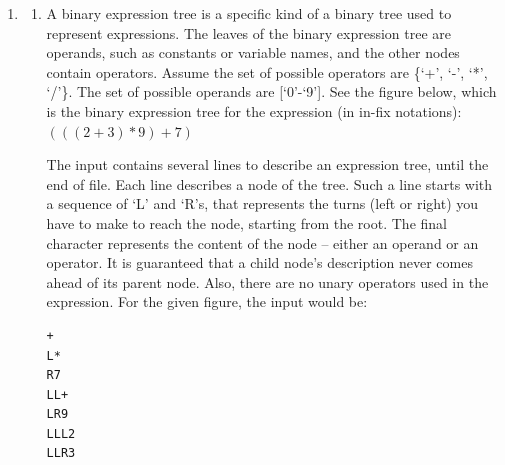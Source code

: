\documentclass[12pt,a3paper]{article}
\newcommand{\yr}[1]{\hfill\textcolor{gray}{\small\textbf{[#1]}}}
\newcommand{\mk}[1]{\textcolor{orange!70!black}{\small\textbf{(#1 marks)}}}
\begin{document}
\begin{enumerate}
\begin{lstlisting}
int insertNode(int *tree, int x);
// x will be inserted into tree as a node.
\end{lstlisting}

\noindent
Also write a recursive C function that counts the number of nodes available in the tree.
\mk{13} \yr{CSE 101 | L-1/T-1 | 2020--21}

\item
  \begin{enumerate}
    \item A binary expression tree is a specific kind of a binary tree used to represent
    expressions. The leaves of the binary expression tree are operands, such as constants or
    variable names, and the other nodes contain operators. Assume the set of possible
    operators are \{`+', `-', `*', `/'\}. The set of possible operands are [`0'-`9']. See the figure
    below, which is the binary expression tree for the expression (in in-fix notations):
    $(((2+3)*9)+7)$

    \begin{figure}[h]
      \centering
    \end{figure}

    The input contains several lines to describe an expression tree, until the end of file. Each
    line describes a node of the tree. Such a line starts with a sequence of `L' and `R's, that
    represents the turns (left or right) you have to make to reach the node, starting from the
    root. The final character represents the content of the node -- either an operand or an
    operator. It is guaranteed that a child node's description never comes ahead of its parent
    node. Also, there are no unary operators used in the expression. For the given figure, the
    input would be:

    \begin{lstlisting}
+
L*
R7
LL+
LR9
LLL2
LLR3
    \end{lstlisting}


\end{enumerate}
\end{enumerate}
\end{document}
